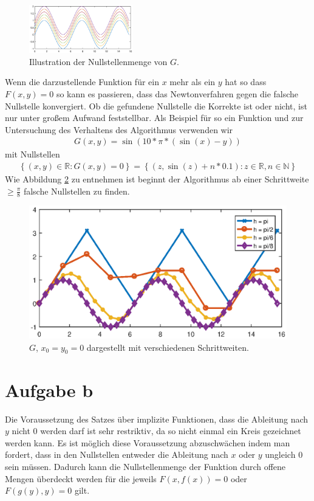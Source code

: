 \documentclass[a4paper,11pt,bibliography=totoc,listof=totoc,headinclude=true,cleardoublepage=empty,oneside]{scrartcl}
\begin{document}
\begin{figure}
	\centering
	\includegraphics[width=0.4\textwidth]{plots/A/vieleSinuse.eps}
	\caption{Illustration der Nullstellenmenge von $G$.}
	\label{fig:vieleSinuse_a}
\end{figure}
Wenn die darzustellende Funktion für ein $x$ mehr als ein $y$ hat so dass $F(x,y)=0$ so kann es passieren, dass das Newtonverfahren gegen die falsche Nullstelle konvergiert. Ob die gefundene Nullstelle die Korrekte ist oder nicht, ist nur unter großem Aufwand feststellbar. Als Beispiel für so ein Funktion und zur Untersuchung des Verhaltens des Algorithmus verwenden wir
\begin{align*}
G(x,y) = \sin(10*\pi*(\sin(x)-y))
\end{align*}
mit Nullstellen
\begin{align*}
\left\lbrace (x,y)\in\mathbb{R}: G(x,y)=0 \right\rbrace = \left\lbrace (z, \sin(z)+n*0.1): z \in \mathbb{R}, n \in \mathbb{N} \right\rbrace
\end{align*}
Wie Abbildung \ref{fig:vieleSinuse_schrittweiten_a} zu entnehmen ist beginnt der Algorithmus ab einer Schrittweite $\geq \frac{\pi}{8}$ falsche Nullstellen zu finden.
\begin{figure}[H]
\centering
\includegraphics[width=0.85\linewidth]{plots/A/vieleSinuse_Schrittweiten.eps}
\caption{$G$, $x_0 = y_0 = 0$ dargestellt mit verschiedenen Schrittweiten.}
\label{fig:vieleSinuse_schrittweiten_a}
\end{figure}


\section{Aufgabe b}
Die Voraussetzung des Satzes über implizite Funktionen, dass die Ableitung nach $y$ nicht $0$ werden darf ist sehr restriktiv, da so nicht einmal ein Kreis gezeichnet werden kann. Es ist möglich diese Voraussetzung abzuschwächen indem man fordert, dass in den Nullstellen entweder die Ableitung nach $x$ oder $y$ ungleich $0$ sein müssen. Dadurch kann die Nullstellenmenge der Funktion durch offene Mengen überdeckt werden für die jeweils $F(x,f(x))=0$ oder $F(g(y),y)=0$ gilt.
\end{document}
